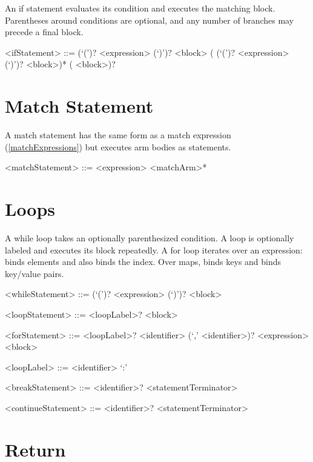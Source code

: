 \documentclass[makeidx]{article}
\begin{document}
\LMHash{}%
An if statement evaluates its condition and executes the matching block.
Parentheses around conditions are optional, and any number of
 branches may precede a final  block.

\begin{grammar}
<ifStatement> ::= \IF{} (`(')? <expression> (`)')? <block>
  \gnewline{} (\ELSE{} \IF{} (`(')? <expression> (`)')? <block>)*
  \gnewline{} (\ELSE{} <block>)?
\end{grammar}

\section{Match Statement}

\LMHash{}%
A match statement has the same form as a match expression
(\ref{matchExpressions}) but executes arm bodies as statements.

\begin{grammar}
<matchStatement> ::= \MATCH{} <expression> \DO{} <matchArm>* \END{}
\end{grammar}

\section{Loops}

\LMHash{}%
A while loop takes an optionally parenthesized condition.
A loop is optionally labeled and executes its block repeatedly.
A for loop iterates over an expression:  binds
elements and  also binds the index. Over maps,
 binds keys and  binds
key/value pairs.

\begin{grammar}
<whileStatement> ::= \WHILE{} (`(')? <expression> (`)')? <block>

<loopStatement> ::= <loopLabel>? \LOOP{} <block>

<forStatement> ::= <loopLabel>? \FOR{} <identifier> (`,' <identifier>)?
  \gnewline{} \IN{} <expression> <block>

<loopLabel> ::= <identifier> `:'

<breakStatement> ::= \BREAK{} <identifier>? <statementTerminator>

<continueStatement> ::= \CONTINUE{} <identifier>? <statementTerminator>
\end{grammar}

\section{Return}
\end{document}
